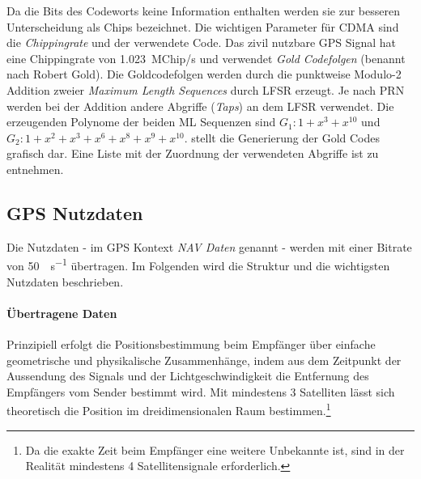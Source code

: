 



Da die Bits des Codeworts keine Information enthalten werden sie zur besseren Unterscheidung als \glspl{Chip} bezeichnet. Die wichtigen Parameter für CDMA sind die \emph{Chippingrate} und der verwendete Code. Das zivil nutzbare GPS Signal hat eine Chippingrate von \SI{1.023}{MChip/s} und verwendet \emph{Gold Codefolgen} (benannt nach Robert Gold). Die Goldcodefolgen werden durch die punktweise Modulo-2 Addition zweier \emph{Maximum Length Sequences} durch \gls{LFSR} erzeugt. Je nach \gls{PRN} werden bei der Addition andere Abgriffe (\emph{Taps}) an dem \gls{LFSR} verwendet. Die erzeugenden Polynome der beiden ML Sequenzen sind $G_1: 1 + x^3 + x^10$ und $G_2: 1 + x^2 + x^3 +x^6 + x^8 + x^9 + x^{10}$.  stellt die Generierung der Gold Codes grafisch dar. Eine Liste mit der Zuordnung der verwendeten Abgriffe ist \cite{specification2010gps} zu entnehmen.


\subsection{GPS Nutzdaten}
Die Nutzdaten - im GPS Kontext \emph{NAV Daten} genannt - werden mit einer Bitrate von \SI{50}{\bit\per\second} übertragen. Im Folgenden wird die Struktur und die wichtigsten Nutzdaten beschrieben.

\paragraph{Übertragene Daten}
Prinzipiell erfolgt die Positionsbestimmung beim Empfänger über einfache geometrische und physikalische Zusammenhänge, indem aus dem Zeitpunkt der Aussendung des Signals und der Lichtgeschwindigkeit die Entfernung des Empfängers vom Sender bestimmt wird. Mit mindestens 3 Satelliten lässt sich theoretisch die Position im dreidimensionalen Raum bestimmen.\footnote{Da die exakte Zeit beim Empfänger eine weitere Unbekannte ist, sind in der Realität mindestens 4 Satellitensignale erforderlich.}

